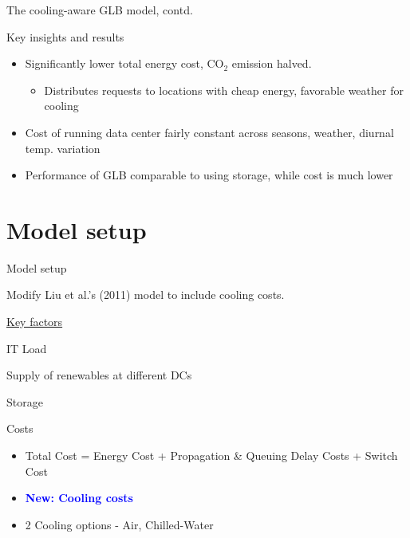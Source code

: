 \documentclass[xcolor=dvipsnames]{beamer}
\newcommand{\carbondioxide}{\ensuremath{\mathrm{CO}_2}}
\begin{document}
\begin{frame}{The cooling-aware GLB model, contd.}

	\begin{block}{Key insights and results}
	\begin{itemize}
		\item{Significantly lower total energy cost, \carbondioxide{} emission halved.}  %
		\begin{itemize}
			\item Distributes requests to locations with cheap energy, favorable weather for cooling  %
		\end{itemize}
		\item{Cost of running data center fairly constant across seasons, weather, diurnal temp. variation}  
		\item {Performance of GLB comparable to using storage, while cost is much lower}
	\end{itemize}
	\end{block}

\end{frame}

\section{Model setup}

\begin{frame}{Model setup}

Modify Liu et al.'s (2011) %
model to include cooling costs.

\vspace{3mm}
\begin{block}{\underline{Key factors}}
\end{block}
\vspace{-2mm}
	
\begin{block}{IT Load}
\end{block}
\vspace{-2mm}

 \begin{block}{Supply of renewables at different DCs}
\end{block}
\vspace{-2mm}

\begin{block}{Storage}
\end{block}
\vspace{-2mm}

\begin{block}{Costs} 
	\begin{itemize}
		\item Total Cost = Energy Cost + Propagation \& Queuing Delay Costs + Switch Cost
		\item {\bf \textcolor{blue}{New: Cooling costs}}
		\item 2 Cooling options - Air, Chilled-Water 
	\end{itemize}
\end{block}

\end{frame}
\end{document}
